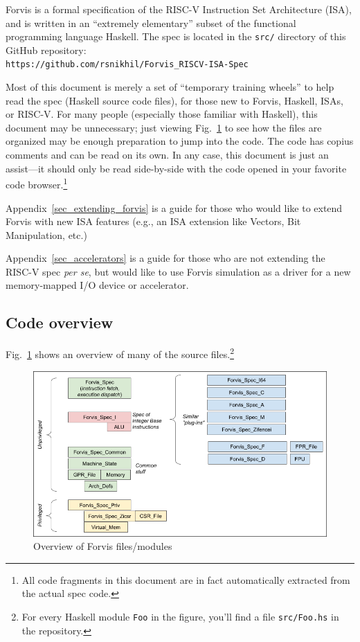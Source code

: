 \documentclass[11pt]{article}
\newcommand{\hmm}{\hspace*{2em}}
\begin{document}
\label{sec_intro}

Forvis is a formal specification of the RISC-V Instruction Set
Architecture (ISA), and is written in an ``extremely elementary''
subset of the functional programming language Haskell.  The spec is
located in the \verb|src/| directory of this GitHub repository: \\
\hmm \verb|https://github.com/rsnikhil/Forvis_RISCV-ISA-Spec|

Most of this document is merely a set of ``temporary training wheels''
to help read the spec (Haskell source code files), for those new to
Forvis, Haskell, ISAs, or RISC-V.  For many people (especially those
familiar with Haskell), this document may be unnecessary; just viewing
Fig.~\ref{Fig_Overview} to see how the files are organized may be
enough preparation to jump into the code.  The code has copius
comments and can be read on its own.  In any case, this document is
just an assist---it should only be read side-by-side with the code
opened in your favorite code browser.\footnote{All code fragments in
this document are in fact automatically extracted from the actual spec
code.}

Appendix~\ref{sec_extending_forvis} is a guide for those who would
like to extend Forvis with new ISA features (e.g., an ISA extension
like Vectors, Bit Manipulation, etc.)

Appendix~\ref{sec_accelerators} is a guide for those who are not
extending the RISC-V spec \emph{per se}, but would like to use Forvis
simulation as a driver for a new memory-mapped I/O device or
accelerator.


\subsection{Code overview}

Fig.~\ref{Fig_Overview} shows an overview of many of the source
files.\footnote{For every Haskell module {\tt Foo} in the figure,
you'll find a file {\tt src/Foo.hs} in the repository.}

\begin{figure}[htbp]
    \centering
    \includegraphics[width=6in]{Figs/Fig_Overview}
    \caption{\label{Fig_Overview}
                    Overview of Forvis files/modules}
\end{figure}
\end{document}
